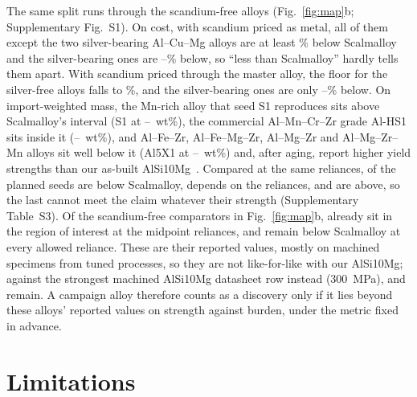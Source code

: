 \documentclass[preprint,12pt]{elsarticle}
\newcommand{\note}[1]{}
\newcommand{\note}[1]{\textcolor{blue!70!black}{\textsf{\footnotesize [Note: #1]}}}
\newcommand{\Scal}{Scalmalloy\xspace}
\newcommand{\AlSi}{AlSi10Mg\xspace}
\begin{document}
The same split runs through the scandium-free alloys (Fig.~\ref{fig:map}b; Supplementary Fig.~S1).
On cost, with scandium priced as metal, all of them except the two silver-bearing Al--Cu--Mg alloys are at least \CostRedMinNonAg\% below \Scal and the silver-bearing ones are \CostRedAgLo--\CostRedAgHi\% below, so ``less than \Scal'' hardly tells them apart. With scandium priced through the master alloy, the floor for the silver-free alloys falls to \CostRedMinMaster\%, and the silver-bearing ones are only \CostRedAgMasterLo--\CostRedAgMasterHi\% below.
On import-weighted mass, the Mn-rich alloy that seed S1 reproduces sits above \Scal's interval (S1 at \BSonenirlo--\BSonenirhi~wt\%), the commercial Al--Mn--Cr--Zr grade Al-HS1 sits inside it (\BAlhsnirlo--\BAlhsnirhi~wt\%), and Al--Fe--Zr, Al--Fe--Mg--Zr, Al--Mg--Zr and Al--Mg--Zr--Mn alloys sit well below it (Al5X1 at \BAlfivenirlo--\BAlfivenirhi~wt\%) and, after aging, report higher yield strengths than our as-built \AlSi~\cite{ds_cp1,alfezr2025,ds_al5x1,croteau2018}.
Compared at the same reliances, of the planned seeds \SeedsBelow{} are below \Scal, \SeedsDepends{} depends on the reliances, and \SeedsAbove{} are above, so the last cannot meet the claim whatever their strength (Supplementary Table~S3).
Of the \NLit{} scandium-free comparators in Fig.~\ref{fig:map}b, \NLitRegionMid{} already sit in the region of interest at the midpoint reliances, and \NLitRegionRobust{} remain below \Scal at every allowed reliance. These are their reported values, mostly on machined specimens from tuned processes, so they are not like-for-like with our \AlSi; against the strongest machined \AlSi datasheet row instead (\SI{300}{MPa}), \NLitRegionMidDS{} and \NLitRegionRobustDS{} remain.
A campaign alloy therefore counts as a discovery only if it lies beyond these alloys' reported values on strength against burden, under the metric fixed in advance.
\note{This was the main risk to the paper's claim (risks.md, R1--R2). It is now handled by design: the claim is against the front, measured here for Al5X1 and Al-HS1, on $B_\mathrm{NIR}$ compared at the same reliances. Under $B_\mathrm{NIR}$, steer the screen toward Fe-, Zr- and Mg-lean families (S2, O1), where the front has room, and away from Mn-rich ones (S1, O3). Sterling to confirm the metric and threshold before the screen ranks anything.}



\section{Limitations}
\label{sec:limits}
\end{document}
